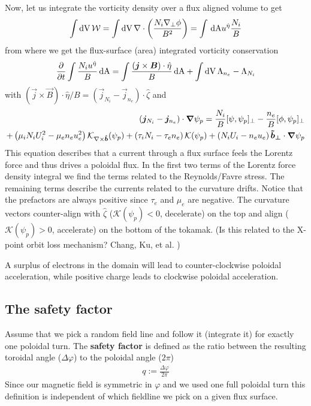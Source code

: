 Now, let us integrate the vorticity density over a flux aligned volume to get
\begin{align}
\int \mathrm{dV}\, \mathcal W =\int \mathrm{dV}\, \nabla\cdot\left(\frac{N_i\nabla_\perp\phi}{B^2}\right)  =  \int \,\mathrm{dA} u^{\hat \eta} \frac{N_i}{B}
\end{align}
from where we get the flux-surface (area) integrated vorticity conservation
\begin{align}
\frac{\partial}{\partial t}\int\frac{N_iu^{\hat \eta}}{B}\,\mathrm{dA}
 = \int\frac{( {\boldsymbol{j}} \times{\boldsymbol{B}})\cdot\hat\eta}{B} \,\mathrm{dA}
 + \int\mathrm{dV}\, \Lambda_{n_e} - \Lambda_{N_i}
 \end{align}
 with $(\vec j\times \vec B)\cdot\hat \eta/B =(\vec j_{N_i} - \vec j_{n_e})\cdot \hat\zeta $ and
\begin{align}
 ({\boldsymbol{j}}_{N_i} - {\boldsymbol{j}}_{n_e})\cdot{\boldsymbol{\nabla}}\psi_p  =
 \frac{N_i}{B}[\psi,\psi_p]_\perp - \frac{n_e}{B}[\phi,\psi_p]_\perp
 \nonumber\\
 + \left( \mu_iN_i U_i^2 - \mu_e n_e u_e^2\right) \mathcal K_{\nabla\times\bm{\hat{b}}}(\psi_p)
 + \left(\tau_i N_i - \tau_e n_e  \right) \mathcal K(\psi_p)
 + \left(N_i U_i - n_eu_e \right){\boldsymbol{\tilde b_\perp}}\cdot{\boldsymbol{\nabla}}\psi_p
\end{align}
This equation describes that a current through a flux surface feels the Lorentz force
and thus drives a poloidal flux.
In the first two terms of the Lorentz force density integral we find the terms related to the Reynolds/Favre stress.
The remaining terms describe the currents related to the curvature drifts. Notice
that the prefactors are always positive since $\tau_e$ and $\mu_e$ are negative.
The curvature vectors counter-align with $\hat \zeta$ ($\mathcal K(\psi_p) < 0$, decelerate) on the top 
and align ($\mathcal K(\psi_p) > 0$, accelerate) on the bottom of the tokamak.
(Is this related to the X-point orbit loss mechanism? Chang, Ku, et al. )

A surplus of electrons in the domain will lead to counter-clockwise poloidal acceleration, while positive
charge leads to clockwise poloidal acceleration.




\subsection{The safety factor}
Assume that we pick a random field line and follow it (integrate it) for exactly one
poloidal turn. The {\bf safety factor} is defined as the ratio between
the resulting toroidal angle ($\Delta\varphi$) to the poloidal angle ($2\pi$)
\begin{align}
q := \frac{\Delta\varphi}{2\pi}
\label{}
\end{align}
Since our magnetic field is symmetric in $\varphi$ and we used one
full poloidal turn this definition is independent of which
fieldline we pick on a given flux surface.

